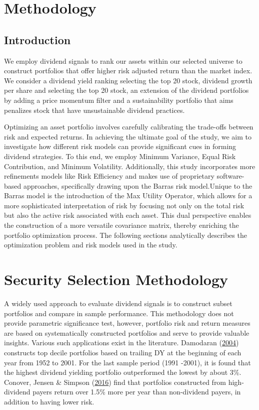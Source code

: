 \documentclass[11pt,preprint, authoryear]{elsarticle}
\numberwithin{equation}{section}
\numberwithin{figure}{section}
\numberwithin{table}{section}
\begin{document}
\hypertarget{methodology}{%
\section{Methodology}\label{methodology}}

\hypertarget{introduction-1}{%
\subsection{Introduction}\label{introduction-1}}

We employ dividend signals to rank our assets within our selected
universe to construct portfolios that offer higher risk adjusted return
than the market index. We consider a dividend yield ranking selecting
the top 20 stock, dividend growth per share and selecting the top 20
stock, an extension of the dividend portfolios by adding a price
momentum filter and a sustainability portfolio that aims penalizes stock
that have unsustainable dividend practices.

Optimizing an asset portfolio involves carefully calibrating the
trade-offs between risk and expected returns. In achieving the ultimate
goal of the study, we aim to investigate how different risk models can
provide significant cues in forming dividend strategies. To this end, we
employ Minimum Variance, Equal Risk Contribution, and Minimum
Volatility. Additionally, this study incorporates more refinements
models like Risk Efficiency and makes use of proprietary software-based
approaches, specifically drawing upon the Barras risk model.Unique to
the Barras model is the introduction of the Max Utility Operator, which
allows for a more sophisticated interpretation of risk by focusing not
only on the total risk but also the active risk associated with each
asset. This dual perspective enables the construction of a more
versatile covariance matrix, thereby enriching the portfolio
optimization process. The following sections analytically describes the
optimization problem and risk models used in the study.

\hypertarget{security-selection-methodology}{%
\section{Security Selection
Methodology}\label{security-selection-methodology}}

A widely used approach to evaluate dividend signals is to construct
subset portfolios and compare in sample performance. This methodology
does not provide parametric significance test, however, portfolio risk
and return measures are based on systematically constructed portfolios
and serve to provide valuable insights. Various such applications exist
in the literature. Damodaran
(\protect\hyperlink{ref-damodaran2004investment}{2004}) constructs top
decile portfolios based on trailing DY at the beginning of each year
from 1952 to 2001. For the last sample period (1991 -2001), it is found
that the highest dividend yielding portfolio outperformed the lowest by
about 3\%. Conover, Jensen \& Simpson
(\protect\hyperlink{ref-conover2016difference}{2016}) find that
portfolios constructed from high-dividend payers return over 1.5\% more
per year than non-dividend payers, in addition to having lower risk.
\end{document}

